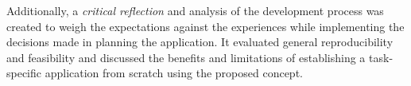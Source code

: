 Additionally, a \emph{critical reflection} and analysis of the development process was created to weigh the expectations against the experiences while implementing the decisions made in planning the application.
It evaluated general reproducibility and feasibility and discussed the benefits and limitations of establishing a task-specific application from scratch using the proposed concept.
